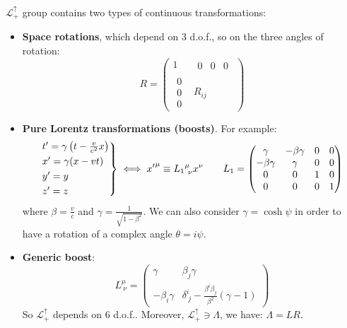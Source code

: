 \documentclass[../../main/main.tex]{subfiles}
\begin{document}
\( \mathcal{L}^{\uparrow}_{+} \) group contains two types of continuous transformations:
\begin{itemize}
    \item \textbf{Space rotations}, which depend on 3 d.o.f., so on the three angles of rotation:
        \[
            R =
            \left(
            \begin{array}{c|c}
            1   & \begin{matrix} 0 & 0 & 0 \end{matrix} \\
            \hline
            \begin{matrix} 0 \\ 0 \\ 0 \end{matrix}   & R_{ij}
            \end{array}
            \right)
        \]

    \item \textbf{Pure Lorentz transformations (boosts)}. For example:
        \[
            \begin{rcases}
                t' = \gamma \left(t - \frac{v}{c^2}x \right) \\
                x' = \gamma (x-vt)  \\
                y' = y  \\
                z' = z
            \end{rcases}
            \iff
            {x'}^{\mu} \equiv {L_1}^{\mu}_{\ \nu} x^{\nu}
            \qquad
            L_1 =
            \begin{pmatrix}
            \gamma   & -\beta \gamma  & 0  & 0 \\
            -\beta \gamma   & \gamma  & 0  & 0 \\
            0   & 0  & 1  & 0 \\
            0   & 0  & 0  & 1
            \end{pmatrix}
        \]
        where \( \beta = \frac{v}{c} \) and \( \gamma = \frac{1}{\sqrt{1 - \beta^2} }  \). We can also consider \( \gamma = \cosh{\psi}  \) in order to have a rotation of a complex angle \( \theta = i \psi \).

    \item \textbf{Generic boost}:
        \[
            L^{\mu }_{\ \nu } =
            \left(
            \begin{array}{c|c}
                \gamma &    \beta_j \gamma \\
                \hline
                -\beta _i \gamma &  \delta ^{i}_{\ j} - \frac{\beta ^i \beta _j}{\beta ^2}(\gamma -1)
            \end{array}
            \right)
        \]
        So \( \mathcal{L}^{\uparrow }_{+} \) depends on 6 d.o.f.. Moreover, \( \mathcal{L}^{\uparrow }_{+} \ni \Lambda \), we have: \( \Lambda = LR \).
\end{itemize}
\end{document}
